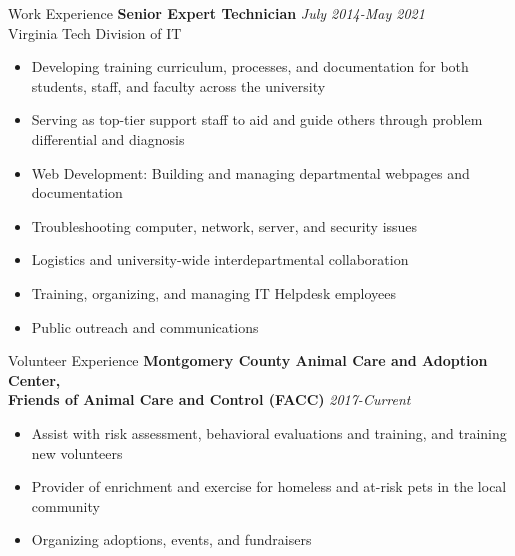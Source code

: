 \documentclass{resume} %
\begin{document}
\begin{rSection}{Work Experience}
  \textbf{Senior Expert Technician} \hfill \textit{July 2014-May 2021} \\
  Virginia Tech Division of IT
   \begin{itemize}
      \itemsep -3pt {} 
      \item Developing training curriculum, processes, and documentation for both students, staff, and faculty across the university
       \item Serving as top-tier support staff to aid and guide others through problem differential and diagnosis
       \item Web Development: Building and managing departmental webpages and documentation
       \item Troubleshooting computer, network, server, and security issues
       \item Logistics and university-wide interdepartmental collaboration
       \item Training, organizing, and managing IT Helpdesk employees
       \item Public outreach and communications
   \end{itemize}

\end{rSection} 

\begin{rSection}{Volunteer Experience} 
    \textbf{Montgomery County Animal Care and Adoption Center, \\ Friends of Animal Care and Control (FACC)} \hfill \textit{2017-Current}
\begin{itemize}
    \item Assist with risk assessment, behavioral evaluations and training, and training new volunteers
    \item Provider of enrichment and exercise for homeless and at-risk pets in the local community
    \item Organizing adoptions, events, and fundraisers
\end{itemize}

\end{rSection}
\end{document}

